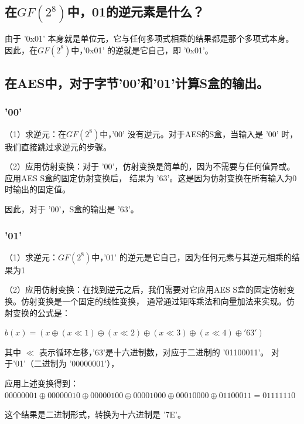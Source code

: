 \documentclass[a4paper,11pt,UTF8]{ctexart}
\begin{document}
    \subsection{在$GF(2^8)$中，01的逆元素是什么？}
        由于 '0x01' 本身就是单位元，它与任何多项式相乘的结果都是那个多项式本身。因此，在$GF(2^8)$中，'0x01' 的逆就是它自己，即 '0x01'。

    \subsection{在AES中，对于字节'00'和'01'计算S盒的输出。}
        \subsubsection{'00'}
        （1）求逆元：在$GF(2^8)$中，'00' 没有逆元。对于AES的S盒，当输入是 '00' 时，我们直接跳过求逆元的步骤。\par
        （2）应用仿射变换：对于 '00'，仿射变换是简单的，因为不需要与任何值异或。应用AES S盒的固定仿射变换后，
            结果为 '63'。这是因为仿射变换在所有输入为0时输出的固定值。\par
            因此，对于 '00'，S盒的输出是 '63'。
        \subsubsection{'01'}
        （1）求逆元：$GF(2^8)$中，'01' 的逆元是它自己，因为任何元素与其逆元相乘的结果为1\par
        （2）应用仿射变换：在找到逆元之后，我们需要对它应用AES S盒的固定仿射变换。仿射变换是一个固定的线性变换，
            通常通过矩阵乘法和向量加法来实现。仿射变换的公式是：\par
            $b(x)=(x\oplus (x\ll 1)\oplus (x\ll 2)\oplus (x\ll 3)\oplus (x\ll 4)\oplus '63') $\par
            其中 $\ll$ 表示循环左移，'63'是十六进制数，对应于二进制的 '01100011'。
            对于'01'（二进制为 '00000001'），\par
            应用上述变换得到：
            $00000001\oplus 00000010\oplus 00000100\oplus 00001000\oplus 00010000\oplus 01100011=01111110$\par
            这个结果是二进制形式，转换为十六进制是 '7E'。
            
\end{document}
